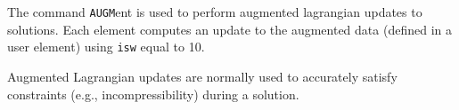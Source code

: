 \headb

The command {\tt AUGM}ent is used to perform augmented
lagrangian updates to solutions.  Each element computes an
update to the augmented data (defined in a user
element) using {\tt isw} equal to 10.

Augmented Lagrangian updates are normally used to accurately
satisfy constraints (e.g., incompressibility) during a solution.
\vfill\eject
